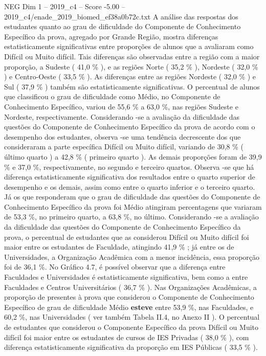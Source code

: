 \begin{textsample}{NEG Dim 1 – 2019\_c4 – Score -5.00 – 2019\_c4/enade\_2019\_biomed\_ef38a0b72c.txt}
A análise das respostas dos estudantes quanto ao grau de dificuldade do Componente de Conhecimento Específico da prova, agregado por Grande Região, mostra diferenças estatisticamente significativas entre proporções de alunos que a avaliaram como Difícil ou Muito difícil.
Tais diferenças são observadas entre a região com a maior proporção, a Sudeste ( 41,0 \% ), e as regiões Norte ( 35,2 \% ), Nordeste ( 32,0 \% ) e Centro-Oeste ( 33,5 \% ).
As diferenças entre as regiões Nordeste ( 32,0 \% ) e Sul ( 37,9 \% ) também são estatisticamente significativas.
O percentual de alunos que classificou o grau de dificuldade como Médio, no Componente de Conhecimento Específico, variou de 55,6 \% a 63,0 \%, nas regiões Sudeste e Nordeste, respectivamente.
Considerando -se a avaliação da dificuldade das questões do Componente de Conhecimento Específico da prova de acordo com o desempenho dos estudantes, observa -se uma tendência decrescente dos que consideraram a parte específica Difícil ou Muito difícil, variando de 30,8 \% ( último quarto ) a 42,8 \% ( primeiro quarto ).
As demais proporções foram de 39,9 \% e 37,0 \%, respectivamente, no segundo e terceiro quartos.
Observa -se que há diferença estatisticamente significativa dos resultados entre o quarto superior de desempenho e os demais, assim como entre o quarto inferior e o terceiro quarto.
Já os que responderam que o grau de dificuldade das questões do Componente de Conhecimento Específico da prova foi Médio atingiram percentagens que variaram de 53,3 \%, no primeiro quarto, a 63,8 \%, no último.
Considerando -se a avaliação da dificuldade das questões do Componente de Conhecimento Específico da prova, o percentual de estudantes que as considerou Difícil ou Muito difícil foi maior entre os estudantes de Faculdade, atingindo 41,9 \% ; já entre os de Universidades, a Organização Acadêmica com a menor incidência, essa proporção foi de 36,1 \%.
No Gráfico 4.7, é possível observar que a diferença entre Faculdades e Universidades é estatisticamente significativa, bem como a entre Faculdades e Centros Universitários ( 36,7 \% ).
Nas Organizações Acadêmicas, a proporção de presentes à prova que considerou o Componente de Conhecimento Específico de grau de dificuldade Médio \textbf{esteve} entre 53,9 \%, nas Faculdades, e 60,2 \%, nas Universidades ( ver também Tabela II.4, no Anexo II ).
O percentual de estudantes que considerou o Componente Específico da prova Difícil ou Muito difícil foi maior entre os estudantes de cursos de IES Privadas ( 38,0 \% ), com diferença estatisticamente significativa da proporção em IES Públicas ( 33,5 \% ).

\end{textsample}
